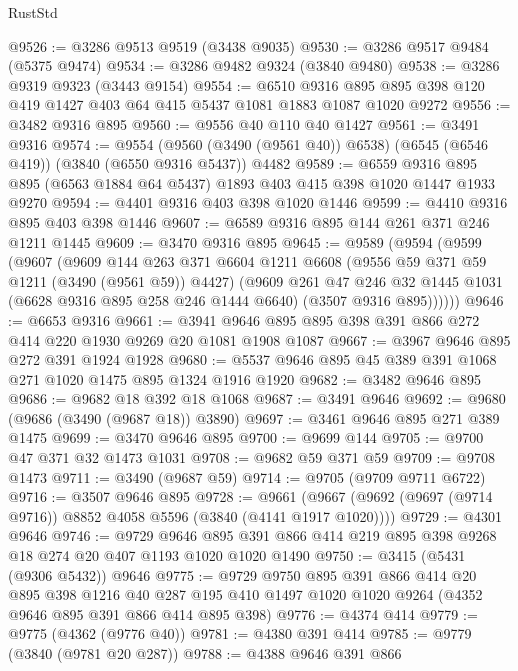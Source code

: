 \begin{lexlean}{RustStd}
\begin{coremodule}
@9526 := @3286 @9513 @9519 (@3438 @9035)
@9530 := @3286 @9517 @9484 (@5375 @9474)
@9534 := @3286 @9482 @9324 (@3840 @9480)
@9538 := @3286 @9319 @9323 (@3443 @9154)
@9554 := @6510
    @9316
    @895
    @895
    @398
    @120
    @419
    @1427
    @403
    @64
    @415
    @5437
    @1081
    @1883
    @1087
    @1020
    @9272
@9556 := @3482 @9316 @895
@9560 := @9556 @40 @110 @40 @1427
@9561 := @3491 @9316
@9574 := @9554
    (@9560 (@3490 (@9561 @40)) @6538)
    (@6545 (@6546 @419))
    (@3840 (@6550 @9316 @5437))
    @4482
@9589 := @6559 @9316 @895 @895 (@6563 @1884 @64 @5437) @1893 @403 @415 @398 @1020 @1447 @1933 @9270
@9594 := @4401 @9316 @403 @398 @1020 @1446
@9599 := @4410 @9316 @895 @403 @398 @1446
@9607 := @6589 @9316 @895 @144 @261 @371 @246 @1211 @1445
@9609 := @3470 @9316 @895
@9645 := @9589
    (@9594
      (@9599
        (@9607
          (@9609
            @144
            @263
            @371
            @6604
            @1211
            @6608
            (@9556 @59 @371 @59 @1211 (@3490 (@9561 @59)) @4427)
            (@9609
              @261
              @47
              @246
              @32
              @1445
              @1031
              (@6628 @9316 @895 @258 @246 @1444 @6640)
              (@3507 @9316 @895))))))
@9646 := @6653 @9316
@9661 := @3941 @9646 @895 @895 @398 @391 @866 @272 @414 @220 @1930 @9269 @20 @1081 @1908 @1087
@9667 := @3967 @9646 @895 @272 @391 @1924 @1928
@9680 := @5537 @9646 @895 @45 @389 @391 @1068 @271 @1020 @1475 @895 @1324 @1916 @1920
@9682 := @3482 @9646 @895
@9686 := @9682 @18 @392 @18 @1068
@9687 := @3491 @9646
@9692 := @9680 (@9686 (@3490 (@9687 @18)) @3890)
@9697 := @3461 @9646 @895 @271 @389 @1475
@9699 := @3470 @9646 @895
@9700 := @9699 @144
@9705 := @9700 @47 @371 @32 @1473 @1031
@9708 := @9682 @59 @371 @59
@9709 := @9708 @1473
@9711 := @3490 (@9687 @59)
@9714 := @9705 (@9709 @9711 @6722)
@9716 := @3507 @9646 @895
@9728 := @9661 (@9667 (@9692 (@9697 (@9714 @9716)) @8852 @4058 @5596 (@3840 (@4141 @1917 @1020))))
@9729 := @4301 @9646
@9746 := @9729
    @9646
    @895
    @391
    @866
    @414
    @219
    @895
    @398
    @9268
    @18
    @274
    @20
    @407
    @1193
    @1020
    @1020
    @1490
@9750 := @3415 (@5431 (@9306 @5432)) @9646
@9775 := @9729
    @9750
    @895
    @391
    @866
    @414
    @20
    @895
    @398
    @1216
    @40
    @287
    @195
    @410
    @1497
    @1020
    @1020
    @9264
    (@4352 @9646 @895 @391 @866 @414 @895 @398)
@9776 := @4374 @414
@9779 := @9775 (@4362 (@9776 @40))
@9781 := @4380 @391 @414
@9785 := @9779 (@3840 (@9781 @20 @287))
@9788 := @4388 @9646 @391 @866

\end{coremodule}
\end{lexlean}
